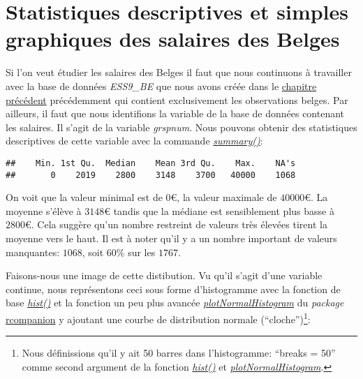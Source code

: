 \documentclass[
]{book}
\newenvironment{Shaded}{\begin{snugshade}}{\end{snugshade}}
\newcommand{\FunctionTok}[1]{\textcolor[rgb]{0.00,0.00,0.00}{#1}}
\newcommand{\NormalTok}[1]{#1}
\newcommand{\SpecialCharTok}[1]{\textcolor[rgb]{0.00,0.00,0.00}{#1}}
\begin{document}
\hypertarget{statistiques-descriptives-et-simples-graphiques-des-salaires-des-belges}{%
\section{Statistiques descriptives et simples graphiques des salaires des Belges}\label{statistiques-descriptives-et-simples-graphiques-des-salaires-des-belges}}

Si l'on veut étudier les salaires des Belges il faut que nous continuons à travailler avec la base de données \emph{ESS9\_BE} que nous avons créée dans le \protect\hyperlink{charge_code_filtrer}{chapitre précédent} précédemment qui contient exclusivement les observations belges. Par ailleurs, il faut que nous identifions la variable de la base de données contenant les salaires. Il s'agit de la variable \emph{grspnum}. Nous pouvons obtenir des statistiques descriptives de cette variable avec la commande \href{https://www.rdocumentation.org/packages/base/versions/3.6.2/topics/summary}{\emph{summary()}}:

\begin{Shaded}
\end{Shaded}

\begin{verbatim}
##    Min. 1st Qu.  Median    Mean 3rd Qu.    Max.    NA's 
##       0    2019    2800    3148    3700   40000    1068
\end{verbatim}

On voit que la valeur minimal est de \(0€\), la valeur maximale de \(40000€\). La moyenne s'élève à \(3148€\) tandis que la médiane est sensiblement plus basse à \(2800€\). Cela suggère qu'un nombre restreint de valeurs très élevées tirent la moyenne vers le haut. Il est à noter qu'il y a un nombre important de valeurs manquantes: \(1068\), soit \(60\%\) sur les \(1767\).

Faisons-nous une image de cette distibution. Vu qu'il s'agit d'une variable continue, nous représentons ceci sous forme d'histogramme avec la fonction de base \href{https://www.rdocumentation.org/packages/graphics/versions/3.6.2/topics/hist}{\emph{hist()}} et la fonction un peu plus avancée \href{https://www.rdocumentation.org/packages/rcompanion/versions/2.4.21/topics/plotNormalHistogram}{\emph{plotNormalHistogram}} du \emph{package} \href{https://rcompanion.org/handbook/}{rcompanion} y ajoutant une courbe de distribution normale (``cloche'')\footnote{Nous définissions qu'il y ait 50 barres dans l'histogramme: ``breaks = 50'' comme second argument de la fonction \href{https://www.rdocumentation.org/packages/graphics/versions/3.6.2/topics/hist}{\emph{hist()}} et \href{https://www.rdocumentation.org/packages/rcompanion/versions/2.4.21/topics/plotNormalHistogram}{\emph{plotNormalHistogram}}.}:
\end{document}
